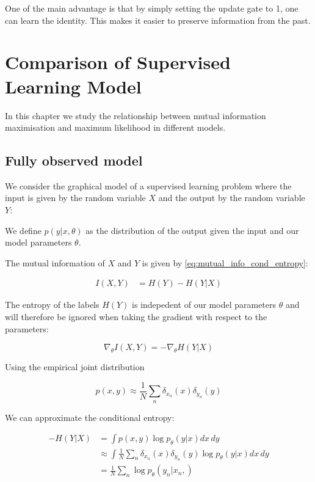\documentclass[11pt,oneside,openright]{report}
\begin{document}
One of the main advantage is that by simply setting the update gate to 1, one can learn the identity. This makes it easier to preserve information from the past.

\chapter{Comparison of Supervised Learning Model}

In this chapter we study the relationship between mutual information maximisation and maximum likelihood in different models.

\section{Fully observed model}

We consider the graphical model of a supervised learning problem where the input is given by the random variable $X$ and the output by the random variable $Y$:

\begin{figure}[H]
\centering
{}
\end{figure}

We define $p(y|x, \theta)$ as the distribution of the output given the input and our model parameters $\theta$.

The mutual information of $X$ and $Y$ is given by \ref{eq:mutual_info_cond_entropy}:

\begin{align}
I(X, Y) &= H(Y) - H(Y|X)
\end{align}

The entropy of the labels $H(Y)$ is indepedent of our model parameters $\theta$ and will therefore be ignored when taking the gradient with respect to the parameters:

$$ \nabla_\theta I(X,Y) = -\nabla_\theta H(Y|X)$$ 

Using the empirical joint distribution 

$$p(x, y) \approx \frac{1}{N}\sum_n\delta_{x_n}(x)\delta_{y_n}(y)$$

We can approximate the conditional entropy:

\begin{align}
- H(Y|X) &= \int p(x, y) \log p_\theta(y|x) dx\, dy\\
	      &\approx \int \frac{1}{N}\sum_n\delta_{x_n}(x)\delta_{y_n}(y) \log p_\theta(y|x)dx\, dy\\
	      &= \frac{1}{N} \sum_n \log p_\theta(y_n|x_n,)
\end{align}
\end{document}
